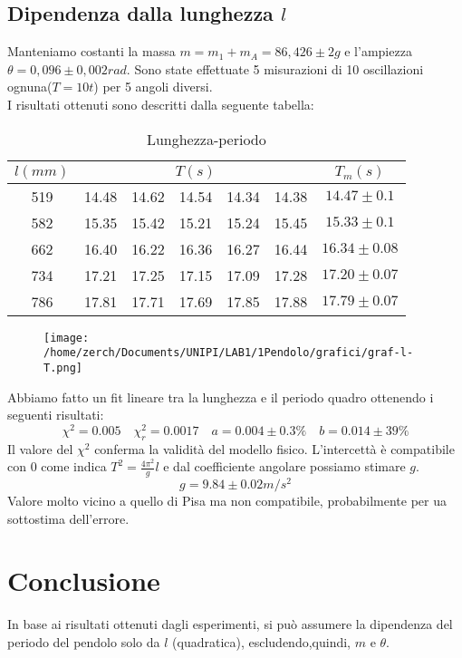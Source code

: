 \documentclass[a4paper,10pt]{article}
\begin{document}
\subsection{Dipendenza dalla lunghezza $l$}
Manteniamo costanti la massa $m=m_1+m_A=86,426\pm2 g$ e l'ampiezza $\theta=0,096\pm0,002 rad$.
Sono state effettuate 5 misurazioni di 10 oscillazioni ognuna($T=10t$) per 5 angoli diversi.
\\I risultati ottenuti sono descritti dalla seguente tabella:\\

\begin{table}[!htb]
\centering
\caption{Lunghezza-periodo}
\label{my-label}
\begin{tabular}{c|ccccc|c}
$l(mm)$ & \multicolumn{5}{c|}{$T(s)$}           & $T_m(s)$       \\ \hline
519     & 14.48 & 14.62 & 14.54 & 14.34 & 14.38 & $14.47\pm0.1$  \\
582     & 15.35 & 15.42 & 15.21 & 15.24 & 15.45 & $15.33\pm0.1$  \\
662     & 16.40 & 16.22 & 16.36 & 16.27 & 16.44 & $16.34\pm0.08$ \\
734     & 17.21 & 17.25 & 17.15 & 17.09 & 17.28 & $17.20\pm0.07$ \\
786     & 17.81 & 17.71 & 17.69 & 17.85 & 17.88 & $17.79\pm0.07$
\end{tabular}
\end{table}

\begin {figure}[!htb]
\begin{center}
\texttt{[image: /home/zerch/Documents/UNIPI/LAB1/1Pendolo/grafici/graf-l-T.png]}
\end{center}
\end {figure}
Abbiamo fatto un fit lineare tra la lunghezza e il periodo quadro ottenendo i seguenti risultati:
\begin{equation}
\chi^2= 0.005 \quad \chi^2_r=0.0017 \quad a=0.004\pm0.3\% \quad b=0.014\pm 39\%
\end{equation}
Il valore del $\chi^2$ conferma la validità del modello fisico. L'intercettà è compatibile con 0 come indica $T^2=\frac{4\pi^2}{g}l$ e dal coefficiente angolare possiamo stimare $g$.
\begin{equation}
g=9.84\pm0.02 m/s^2
\end{equation}
Valore molto vicino a quello di Pisa ma non compatibile, probabilmente per ua sottostima dell'errore.


\pagebreak
\section{Conclusione}
In base ai risultati ottenuti dagli esperimenti, si può assumere la dipendenza del periodo del pendolo solo da $l$ (quadratica), escludendo,quindi, $m$ e $\theta$.
\end{document}
